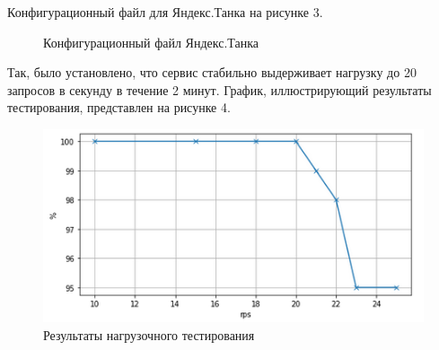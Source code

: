     Конфигурационный файл для Яндекс.Танка на рисунке 3.
    \begin{figure}[H]
        \centering
        
        \caption{Конфигурационный файл Яндекс.Танка}
        \label{fig:tank-load}
    \end{figure}

    Так, было установлено, что сервис стабильно выдерживает нагрузку до 20
    запросов в секунду в течение 2 минут.
    График, иллюстрирующий результаты тестирования, представлен на рисунке 4.
    \begin{figure}[H]
        \centering
        \includegraphics[width=0.7\linewidth]{static/tank-result.png}
        \caption{Результаты нагрузочного тестирования}
        \label{fig:tank-result}
    \end{figure}

